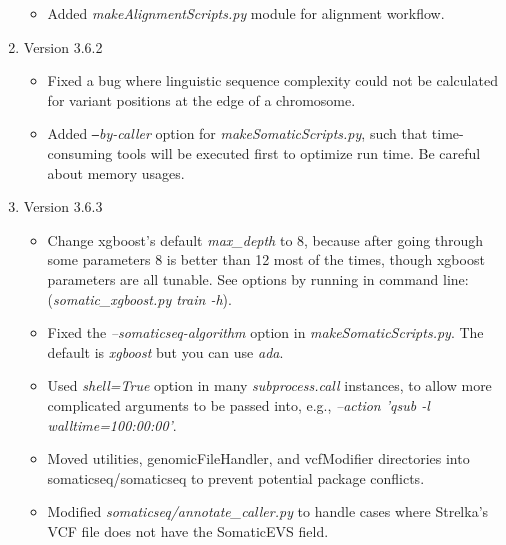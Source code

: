 \documentclass[10pt,letterpaper]{article}
\begin{document}
\begin{sloppypar}
\begin{enumerate}
\begin{itemize}
            \item Added \textit{makeAlignmentScripts.py} module for alignment workflow.
            
	\end{itemize}


	\item Version 3.6.2

        \begin{itemize}
            \item Fixed a bug where linguistic sequence complexity could not be calculated for variant positions at the edge of a chromosome.
                        
            \item Added \textit{\texttt{--}by-caller} option for \textit{makeSomaticScripts.py}, such that time-consuming tools will be executed first to optimize run time. Be careful about memory usages. 
        \end{itemize}


	\item Version 3.6.3

        \begin{itemize}
            \item Change xgboost's default \textit{max\_depth} to 8, because after going through some parameters 8 is better than 12 most of the times, though xgboost parameters are all tunable. See options by running in command line: (\textit{somatic\_xgboost.py train -h}).
            
            \item Fixed the \textit{--somaticseq-algorithm} option in \textit{makeSomaticScripts.py}. The default is \textit{xgboost} but you can use \textit{ada}. 
            
            \item Used \textit{shell=True} option in many \textit{subprocess.call} instances, to allow more complicated arguments to be passed into, e.g., \textit{--action 'qsub -l walltime=100:00:00'}.
            
            \item Moved utilities, genomicFileHandler, and vcfModifier directories into somaticseq/somaticseq to prevent potential package conflicts.
            
            \item Modified \textit{somaticseq/annotate\_caller.py} to handle cases where Strelka's VCF file does not have the SomaticEVS field. 
            

\end{itemize}
\end{enumerate}
\end{sloppypar}
\end{document}

